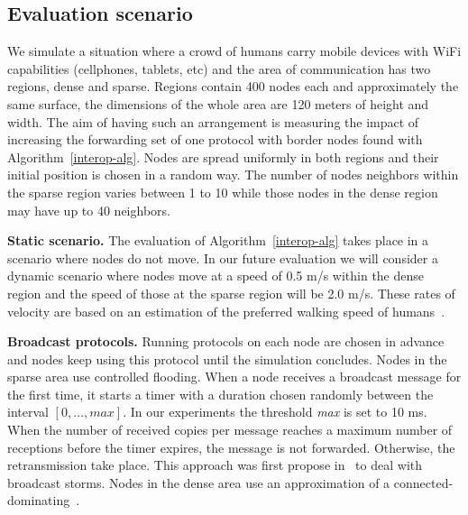 \subsection{Evaluation scenario}
\label{interop:scenario}

We simulate a situation where a crowd of humans carry mobile devices with WiFi capabilities (cellphones, tablets, etc) and the area of communication has two regions, dense and sparse.
%
Regions contain 400 nodes each and approximately the same surface, the dimensions of the whole area are 120 meters of height and width.
%
The aim of having such an arrangement is measuring the impact of increasing the forwarding set of one protocol with border nodes found with Algorithm~\ref{interop-alg}.
%
Nodes are spread uniformly in both regions and their initial position is chosen in a random way.
%
The number of nodes neighbors within the sparse region varies between 1 to 10 while those nodes in the dense region may have up to 40 neighbors.


\smallskip
\noindent
\textbf{Static scenario.}
%
The evaluation of Algorithm~\ref{interop-alg} takes place in a scenario where nodes do not move.
%
In our future evaluation we will consider a dynamic scenario where nodes move at a speed of 0.5 m/s within the dense region and the speed of those at the sparse region will be 2.0 m/s. These rates of velocity are based on an estimation of the preferred walking speed of humans~\cite{Browning390}.
%
%


\smallskip
\noindent
\textbf{Broadcast protocols.}
Running protocols on each node are chosen in advance and nodes keep using this protocol until the simulation concludes.
%
Nodes in the sparse area use controlled flooding.
%
When a node receives a broadcast message for the first time, it starts a timer with a duration chosen randomly between the interval $[0,\dots,max]$. In our experiments the threshold \emph{max} is set to 10 ms.
%
When the number of received copies per message reaches a maximum number of receptions before the timer expires, the message is not forwarded. Otherwise, the retransmission take place.
%
This approach was first propose in~\cite{Ni:1999:BSP:313451.313525} to deal with broadcast storms.
Nodes in the dense area use an approximation of a connected-dominating~\cite{qayyum:inria-00072756}.


